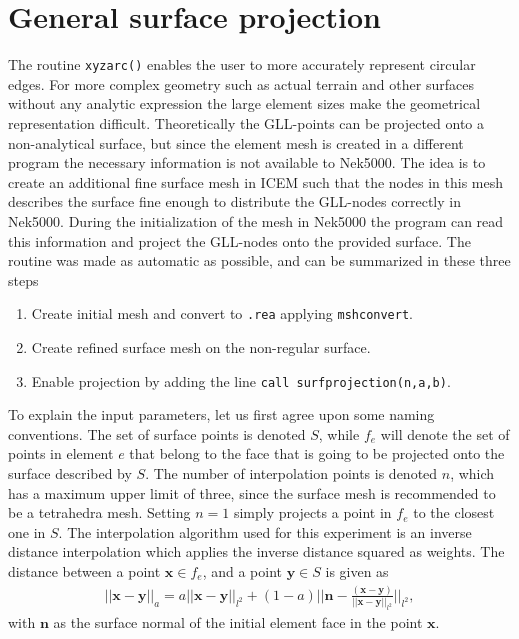 \section{General surface projection}\label{surfpro}
The routine \verb|xyzarc()| enables the user to more accurately represent circular edges.
For more complex geometry such as actual terrain and other surfaces without any analytic
expression the large element sizes make the geometrical representation difficult. 
Theoretically the GLL-points can be projected onto a non-analytical surface, but since 
the element mesh is created in a different program the necessary information is not available
to Nek5000. The idea is to create an additional fine surface mesh in ICEM such
that the nodes in this mesh describes the surface fine enough to distribute the GLL-nodes correctly in Nek5000.
During the initialization of the mesh in Nek5000 the program can read this information and project the GLL-nodes onto 
the provided surface. 
The routine was made as automatic as possible, and can be summarized in these three steps
\begin{enumerate}
    \item Create initial mesh and convert to \verb|.rea| applying \verb|mshconvert|.
        \item Create refined surface mesh on the non-regular surface.
        \item Enable projection by adding the line \verb|call surfprojection(n,a,b)|.
\end{enumerate}

To explain the input parameters, let us first agree upon some naming conventions. 
The set of surface points is denoted $S$, while $f_e$ will denote the set of points 
in element $e$ that belong to the face that is going to be projected onto the surface described by $S$.
The number of interpolation points is denoted $n$, which has a maximum upper limit of three,
since the surface mesh is recommended to be a tetrahedra mesh. Setting $n=1$ simply projects 
a point in $f_e$ to the closest one in $S$.
The interpolation algorithm used for this experiment is an inverse distance interpolation
which applies the inverse distance squared as weights. The distance between a point
$\mathbf{x}\in f_e$, and a point $\mathbf{y} \in S $ is given as 
\begin{align}
    ||\mathbf{x}-\mathbf{y}||_{a} = a ||\mathbf{x}-\mathbf{y}||_{l^2}
    + (1-a)||\mathbf{n} - \frac{(\mathbf{x}-\mathbf{y})}{||\mathbf{x}-\mathbf{y}||_{l^2}}||_{l^2},
    \label{eq:distancenorm}
\end{align}
with $\mathbf{n}$ as the surface normal of the initial element face in the point $\mathbf{x}$.

